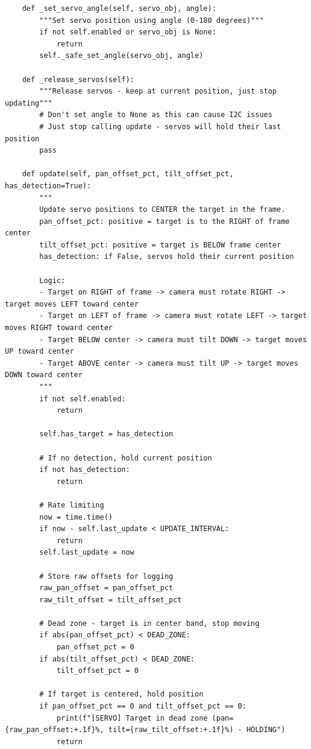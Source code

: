 \documentclass[11pt,a4paper]{article}
\begin{document}
\begin{lstlisting}
    def _set_servo_angle(self, servo_obj, angle):
        """Set servo position using angle (0-180 degrees)"""
        if not self.enabled or servo_obj is None:
            return
        self._safe_set_angle(servo_obj, angle)
    
    def _release_servos(self):
        """Release servos - keep at current position, just stop updating"""
        # Don't set angle to None as this can cause I2C issues
        # Just stop calling update - servos will hold their last position
        pass
    
    def update(self, pan_offset_pct, tilt_offset_pct, has_detection=True):
        """
        Update servo positions to CENTER the target in the frame.
        pan_offset_pct: positive = target is to the RIGHT of frame center
        tilt_offset_pct: positive = target is BELOW frame center
        has_detection: if False, servos hold their current position
        
        Logic:
        - Target on RIGHT of frame -> camera must rotate RIGHT -> target moves LEFT toward center
        - Target on LEFT of frame -> camera must rotate LEFT -> target moves RIGHT toward center
        - Target BELOW center -> camera must tilt DOWN -> target moves UP toward center
        - Target ABOVE center -> camera must tilt UP -> target moves DOWN toward center
        """
        if not self.enabled:
            return
        
        self.has_target = has_detection
        
        # If no detection, hold current position
        if not has_detection:
            return
        
        # Rate limiting
        now = time.time()
        if now - self.last_update < UPDATE_INTERVAL:
            return
        self.last_update = now
        
        # Store raw offsets for logging
        raw_pan_offset = pan_offset_pct
        raw_tilt_offset = tilt_offset_pct
        
        # Dead zone - target is in center band, stop moving
        if abs(pan_offset_pct) < DEAD_ZONE:
            pan_offset_pct = 0
        if abs(tilt_offset_pct) < DEAD_ZONE:
            tilt_offset_pct = 0
        
        # If target is centered, hold position
        if pan_offset_pct == 0 and tilt_offset_pct == 0:
            print(f"[SERVO] Target in dead zone (pan={raw_pan_offset:+.1f}%, tilt={raw_tilt_offset:+.1f}%) - HOLDING")
            return
        

\end{lstlisting}
\end{document}
